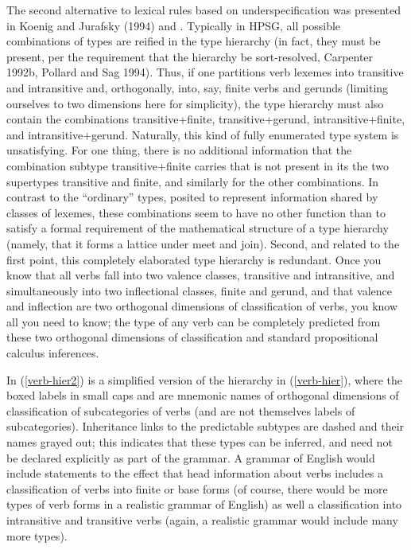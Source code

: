 \documentclass[output=paper]{langsci/langscibook}
\begin{document}
{The second alternative to lexical rules based on underspecification was presented in Koenig and Jurafsky (1994) and \citet{Koenig99a}. Typically in HPSG, all possible combinations of types are reified in the type hierarchy (in fact, they must be present, per the requirement that the hierarchy be sort-resolved, Carpenter 1992b, Pollard and Sag 1994). Thus, if one partitions verb lexemes into transitive and intransitive and, orthogonally, into, say, finite verbs and gerunds (limiting ourselves to two dimensions here for simplicity), the type hierarchy must also contain the combinations transitive+finite, transitive+gerund, intransitive+finite, and intransitive+gerund. Naturally, this kind of fully enumerated type system is unsatisfying. For one thing, there is no additional information that the combination subtype transitive+finite carries that is not present in its the two supertypes transitive and finite, and similarly for the other combinations. In contrast to the ``ordinary'' types, posited to represent information shared by classes of lexemes, these combinations seem to have no other function than to satisfy a formal requirement of the mathematical structure of a type hierarchy (namely, that it forms a lattice under meet and join).  Second, and related to the first point, this completely elaborated type hierarchy is redundant. Once you know that all verbs fall into two valence classes, transitive and intransitive, and simultaneously into two inflectional classes, finite and gerund, and that valence and inflection are two orthogonal dimensions of classification of verbs, you know all you need to know; the type of any verb can be completely predicted from these two orthogonal dimensions of classification and standard propositional calculus inferences.

In (\ref{verb-hier2}) is a simplified version of the hierarchy in (\ref{verb-hier}), where the boxed labels in small caps  and  are mnemonic names of orthogonal dimensions of classification  of subcategories of verbs (and are not themselves labels of subcategories). Inheritance links to the predictable subtypes are dashed and their names grayed out; this indicates that these types can be inferred, and need not be declared explicitly as part of the grammar. A grammar of English would include statements to the effect that head information about verbs includes a classification of verbs into finite or base forms (of course, there would be more types of verb forms in a realistic grammar of English) as well a classification into intransitive and transitive verbs (again, a realistic grammar would include many more types).


}
\end{document}
